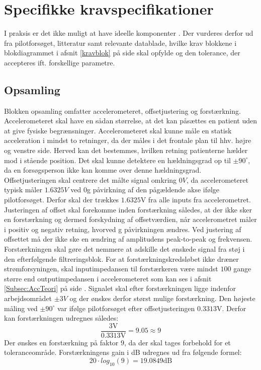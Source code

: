 \section{Specifikke kravspecifikationer}
I praksis er det ikke muligt at have ideelle komponenter \cite{Nilsson2011}. Der vurderes derfor ud fra pilotforsøget, litteratur samt relevante datablade, hvilke krav blokkene i blokdiagrammet i afsnit \ref{kravblok} på side \pageref{kravblok} skal opfylde og den tolerance, der accepteres ift. forskellige parametre.

\subsection{Opsamling}\label{OpsamlingsAfs}
Blokken opsamling omfatter accelerometeret, offsetjustering og forstærkning. Accelerometeret skal have en sådan størrelse, at det kan påsættes en patient uden at give fysiske begrænsninger. Accelerometeret skal kunne måle en statisk acceleration i mindst to retninger, da der måles i det frontale plan til hhv. højre og venstre side. Herved kan det bestemmes, hvilken retning patienterne hælder mod i stående position. Det skal kunne detektere en hældningsgrad op til $\pm90^{\circ}$, da en forsøgsperson ikke kan komme over denne hældningsgrad. \\
Offsetjusteringen skal centrere det målte signal omkring $0V$, da accelerometeret typisk måler $1.6325V$ ved $0$g påvirkning af den pågældende akse ifølge pilotforsøget. Derfor skal der trækkes $1.6325$V fra alle inputs fra accelerometret. Justeringen af offset skal forekomme inden forstærkning således, at der ikke sker en forstærkning og dermed forskydning af offsetværdien, når accelerometret måler i positiv og negativ retning, hvorved g påvirkningen ændres. Ved justering af offsettet må der ikke ske en ændring af amplitudens peak-to-peak og frekvensen. \\
Forstærkningen skal gøre det nemmere at adskille det ønskede signal fra støj i den efterfølgende filtreringsblok. For at forstærkningskredsløbet ikke dræner strømforsyningen, skal inputimpedansen til forstærkeren være mindst $100$ gange større end outputimpedansen i accelerometeret som kan ses i afsnit \ref{Subsec:AccTeori} på side \pageref{Subsec:AccTeori}. Signalet skal efter forstærkningen ligge indenfor arbejdsområdet $\pm3V$ og der ønskes derfor størst mulige forstærkning. Den højeste måling ved $\pm90^{\circ}$ var ifølge pilotforsøget efter offsetjusteringen $0.3313$V. Derfor kan forstærkningen udregnes således:
\begin{equation}
\dfrac{3\text{V}}{0.3313\text{V}} =  9.05 \approx 9
\end{equation}
\noindent Der ønskes en forstærkning på faktor $9$, da der skal tages forbehold for et toleranceområde. Forstærkningens gain i dB udregnes ud fra følgende formel: 
\begin{equation}
20 \cdot log_{10} (9) = 19.0849\text{dB}
\end{equation} 

